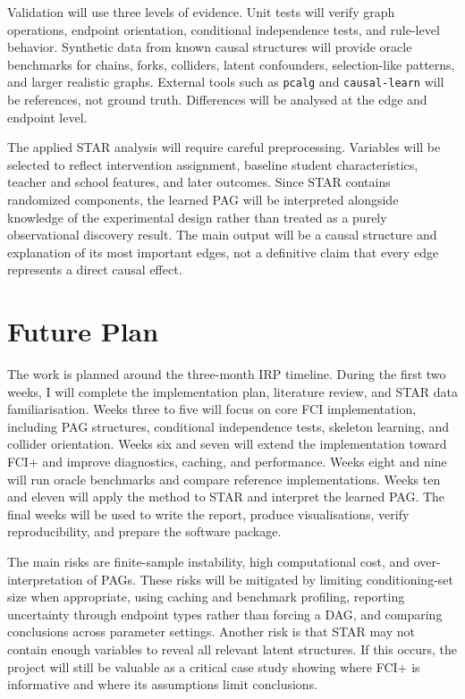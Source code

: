 \documentclass[11pt,a4paper]{article}
\begin{document}
Validation will use three levels of evidence. Unit tests will verify graph operations, endpoint orientation, conditional independence tests, and rule-level behavior. Synthetic data from known causal structures will provide oracle benchmarks for chains, forks, colliders, latent confounders, selection-like patterns, and larger realistic graphs. External tools such as \texttt{pcalg} and \texttt{causal-learn} will be references, not ground truth. Differences will be analysed at the edge and endpoint level.

The applied STAR analysis will require careful preprocessing. Variables will be selected to reflect intervention assignment, baseline student characteristics, teacher and school features, and later outcomes. Since STAR contains randomized components, the learned PAG will be interpreted alongside knowledge of the experimental design rather than treated as a purely observational discovery result. The main output will be a causal structure and explanation of its most important edges, not a definitive claim that every edge represents a direct causal effect.

\section*{Future Plan}

The work is planned around the three-month IRP timeline. During the first two weeks, I will complete the implementation plan, literature review, and STAR data familiarisation. Weeks three to five will focus on core FCI implementation, including PAG structures, conditional independence tests, skeleton learning, and collider orientation. Weeks six and seven will extend the implementation toward FCI+ and improve diagnostics, caching, and performance. Weeks eight and nine will run oracle benchmarks and compare reference implementations. Weeks ten and eleven will apply the method to STAR and interpret the learned PAG. The final weeks will be used to write the report, produce visualisations, verify reproducibility, and prepare the software package.

The main risks are finite-sample instability, high computational cost, and over-interpretation of PAGs. These risks will be mitigated by limiting conditioning-set size when appropriate, using caching and benchmark profiling, reporting uncertainty through endpoint types rather than forcing a DAG, and comparing conclusions across parameter settings. Another risk is that STAR may not contain enough variables to reveal all relevant latent structures. If this occurs, the project will still be valuable as a critical case study showing where FCI+ is informative and where its assumptions limit conclusions.
\end{document}
